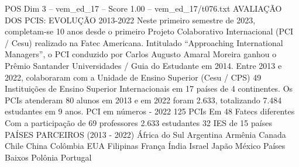 \begin{textsample}{POS Dim 3 – vem\_ed\_17 – Score 1.00 – vem\_ed\_17/t076.txt}  \label{ex:f3_pos_178}
AVALIAÇÃO DOS PCIS: EVOLUÇÃO 2013-2022 Neste primeiro semestre de 2023, completam-se 10 anos desde o primeiro Projeto Colaborativo Internacional (PCI / Cesu) realizado na Fatec Americana.
Intitulado “Approaching International Managers”, o PCI conduzido por Carlos Augusto Amaral Moreira ganhou o Prêmio Santander Universidades / Guia do Estudante em 2014.
Entre 2013 e 2022, colaboraram com a Unidade de Ensino Superior (Cesu / CPS) 49 Instituições de Ensino Superior Internacionais em 17 países de 4 continentes.
Os PCIs atenderam 80 alunos em 2013 e em 2022 foram 2.633, totalizando 7.484 estudantes em 9 anos.
PCI em números - 2022 125 PCIs Em 48 Fatecs diferentes Com a participação de 69 professores 2.633 estudantes 32 IES de 15 países PAÍSES PARCEIROS (2013 - 2022) África do Sul Argentina Armênia Canada Chile China Colômbia EUA Filipinas França Índia Israel Japão México Países Baixos Polônia Portugal

\end{textsample}
